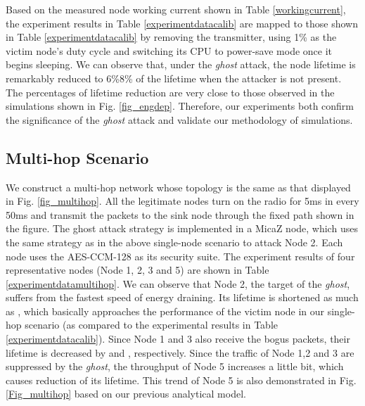 \documentclass[10pt,journal,cspaper,compsoc]{IEEEtran}
\begin{document}
Based on the measured node working current shown in Table \ref{workingcurrent}, the experiment results in Table \ref{experimentdatacalib} are mapped to those shown in Table \ref{experimentdatacalib} by removing the transmitter, using 1\% as the victim node's duty cycle and switching its CPU to power-save mode once it begins sleeping. We can observe that, under the {\em ghost} attack, the node lifetime is remarkably reduced to 6\%8\% of the lifetime when the attacker is not present. The percentages of lifetime reduction are very close to those observed in the simulations shown in Fig. \ref{fig_engdep}. Therefore, our experiments both confirm the significance of the {\em ghost} attack and validate our methodology of simulations.

\subsection{Multi-hop Scenario}
We construct a multi-hop network whose topology is the same as that displayed in Fig. \ref{fig_multihop}. All the legitimate nodes turn on the radio for 5ms in every 50ms and transmit the packets to the sink node through the fixed path shown in the figure. The ghost attack strategy is implemented in a MicaZ node, which uses the same strategy as in the above single-node scenario to attack Node 2. Each node uses the AES-CCM-128 as its security suite. The experiment results of four representative nodes (Node 1, 2, 3 and 5) are shown in Table \ref{experimentdatamultihop}. We can observe that Node 2, the target of the {\em ghost}, suffers from the fastest speed of energy draining. Its lifetime is shortened as much as , which basically approaches the performance of the victim node in our single-hop scenario (as compared to the experimental results in Table \ref{experimentdatacalib}). Since Node 1 and 3 also receive the bogus packets, their lifetime is decreased by  and , respectively. Since the traffic of Node 1,2 and 3 are suppressed by the {\em ghost}, the throughput of Node 5 increases a little bit, which causes  reduction of its lifetime. This trend of Node 5 is also demonstrated in Fig. \ref{Fig_multihop} based on our previous analytical model.
\end{document}
